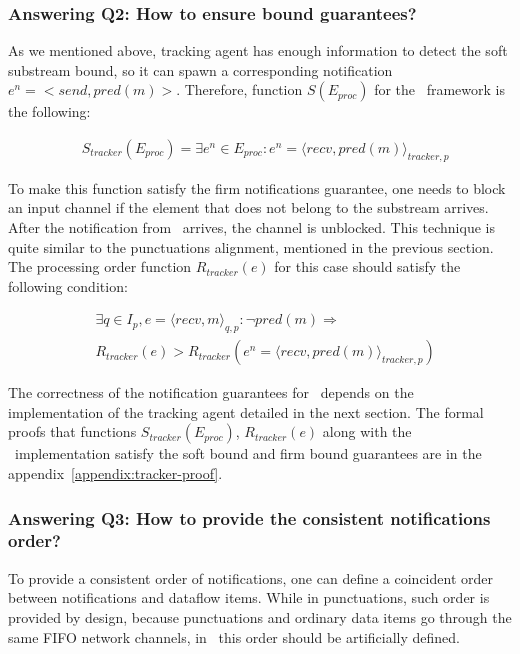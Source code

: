 \subsubsection{Answering Q2: How to ensure bound guarantees?}

As we mentioned above, tracking agent has enough information to detect the soft substream bound, so it can spawn a corresponding notification $e^{n} = <send,pred(m)>$. Therefore, function $S(E_{proc})$ for the \tracker\ framework is the following:

\begin{align*}
& S_{tracker}(E_{proc}) = \exists e^{n} \in E_{proc} : e^{n} = \langle recv,pred(m)\rangle_{tracker,p}
\end{align*}

To make this function satisfy the firm notifications guarantee, one needs to block an input channel if the element that does not belong to the substream arrives. After the notification from \tracker\ arrives, the channel is unblocked. This technique is quite similar to the punctuations alignment, mentioned in the previous section. The processing order function $R_{tracker}(e)$ for this case should satisfy the following condition:

\begin{align*}
& \exists q \in I_p, e = \langle recv,m \rangle_{q,p}: \neg pred(m) \Longrightarrow \\ 
& R_{tracker}(e) > R_{tracker}(e^{n}= \langle recv,pred(m) \rangle_{tracker,p})
\end{align*}

The correctness of the notification guarantees for \tracker\ depends on the implementation of the tracking agent detailed in the next section. The formal proofs that functions $S_{tracker}(E_{proc})$, $R_{tracker}(e)$ along with the \tracker\ implementation satisfy the soft bound and firm bound guarantees are in the appendix~\ref{appendix:tracker-proof}.

\subsubsection{Answering Q3: How to provide the consistent notifications order?}
To provide a consistent order of notifications, one can define a coincident order between notifications and dataflow items. While in punctuations, such order is provided by design, because punctuations and ordinary data items go through the same FIFO network channels, in \tracker\, this order should be artificially defined.

